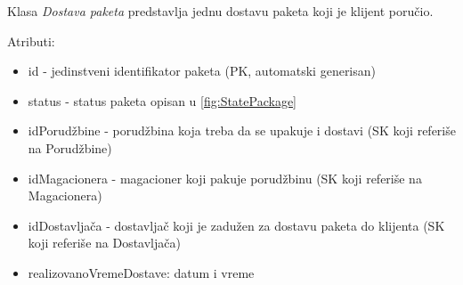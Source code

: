 Klasa \textit{Dostava paketa} predstavlja jednu dostavu paketa koji je klijent poručio.

Atributi:
\begin{itemize}
    \item id - jedinstveni identifikator paketa (PK, automatski generisan)
    \item status - status paketa opisan u \ref{fig:StatePackage}
    \item idPorudžbine - porudžbina koja treba da se upakuje i dostavi (SK koji referiše na Porudžbine)
    \item idMagacionera - magacioner koji pakuje porudžbinu (SK koji referiše na Magacionera)
    \item idDostavljača - dostavljač koji je zadužen za dostavu paketa do klijenta (SK koji referiše na Dostavljača)
    \item realizovanoVremeDostave: datum i vreme
\end{itemize}